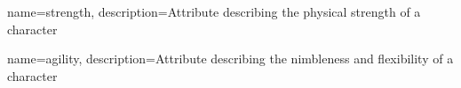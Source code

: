 {
    name=strength,
    description={Attribute describing the physical strength of a character}
}

{
    name=agility,
    description={Attribute describing the nimbleness and flexibility of a
            character}
}

